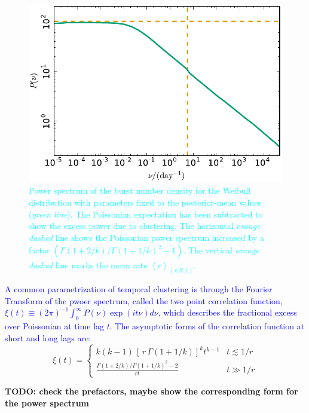 \documentclass[fleqn,usenatbib]{mnras}
\newcommand{\new}[1]{\textcolor{cyan}{#1}}
\begin{document}
\begin{figure}
	\includegraphics[width=1.0\columnwidth]{powspec_weibull.pdf}
	\caption{\label{fig:powspec}\new{Power spectrum of the burst number density for the Weibull distribution with parameters fixed to the posterior-mean values (\emph{green line}). The Poissonian expectation has been subtracted to show the excess power due to clustering. The horizontal \emph{orange dashed} line shows the Poissonian power spectrum increased by a factor $(\Gamma(1 + 2/k)/\Gamma(1 + 1/k)^2 - 1)$. The vertical \emph{orange dashed} line marks the mean rate $\left<r\right>_{(r|N,t)}$.}}
\end{figure}

\textcolor{blue}{
A common parametrization of temporal clustering is through the Fourier
Transform of the pwoer spectrum, called the two
point correlation function, $\xi(t) \equiv (2\pi)^{-1}\int_0^\infty
P(\nu) \exp(i t\nu)d\nu$, which describes the fractional 
excess over Poissonian at time lag $t$. The asymptotic forms of the
correlation function at short and long lags are:}
\begin{equation}
\xi(t)=\left\{ \begin{array}{ll}  k(k-1) \, \left[\, r\, \Gamma\left(1 + 1/k\right)\right]^k  t^{k-1} & t \lesssim 1/r \\
               \frac{ \Gamma(1 + 2/k)/\Gamma(1 + 1/k)^2 - 2}{rt} & t \gg 1/r\end{array} \right.
\end{equation}

{\bf TODO: check the prefactors, maybe show the corresponding form for the
  power spectrum}

% 
\end{document}
